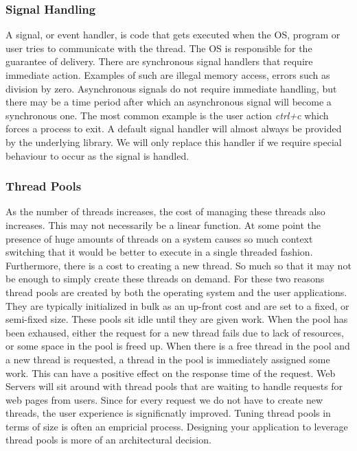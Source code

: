 \documentclass[10pt,a4paper]{article}
\begin{document}
\subsubsection{Signal Handling}
A signal, or event handler, is code that gets executed when the OS, program or user tries to communicate with the thread. The OS is responsible for the guarantee of delivery. There are synchronous signal handlers that require immediate action. Examples of such are illegal memory access, errors such as division by zero. Asynchronous signals do not require immediate handling, but there may be a time period after which an asynchronous signal will become a synchronous one. The most common example is the user action {\it ctrl+c} which forces a process to exit. A default signal handler will almost always be provided by the underlying library. We will only replace this handler if we require special behaviour to occur as the signal is handled.   
\subsubsection{Thread Pools}
As the number of threads increases, the cost of managing these threads also increases. This may not necessarily be a linear function. At some point the presence of huge amounts of threads on a system causes so much context switching that it would be better to execute in a single threaded fashion. Furthermore, there is a cost to creating a new thread. So much so that it may not be enough to simply create these threads on demand. For these two reasons thread pools are created by both the operating system and the user applications. They are typically initialized in bulk as an up-front cost and are set to a fixed, or semi-fixed size. These pools sit idle until they are given work. When the pool has been exhaused, either the request for a new thread fails due to lack of resources, or some space in the pool is freed up. When there is a free thread in the pool and a new thread is requested, a thread in  the pool is immediately assigned some work. This can have a positive effect on the response time of the request. Web Servers will sit around with thread pools that are waiting to handle requests for web pages from users. Since for every request we do not have to create new threads, the user experience is significnatly improved. Tuning thread pools in terms of size is often an empricial process. Designing your application to leverage thread pools is more of an architectural decision.
\end{document}
